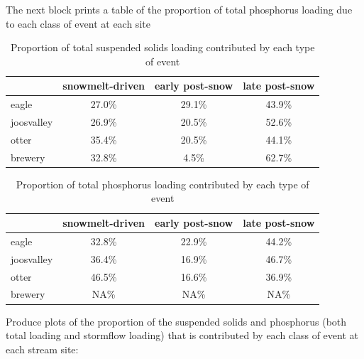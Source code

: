 \documentclass[12pt]{article}
\begin{document}
The next block prints a table of the proportion of total phosphorus loading due to each class of event at each site\\


\begin{table}[h]
\begin{center}
\begin{tabular}{lccc}
  & snowmelt-driven & early post-snow & late post-snow \\ 
  \hline
eagle & 27.0\% & 29.1\% & 43.9\% \\ 
  joosvalley & 26.9\% & 20.5\% & 52.6\% \\ 
  otter & 35.4\% & 20.5\% & 44.1\% \\ 
  brewery & 32.8\% & 4.5\% & 62.7\% \\ 
  \end{tabular}
\caption{Proportion of total suspended solids loading contributed by each type of event}
\label{tab:stot}
\end{center}
\end{table}
\begin{table}[h]
\begin{center}
\begin{tabular}{lccc}
  & snowmelt-driven & early post-snow & late post-snow \\ 
  \hline
eagle & 32.8\% & 22.9\% & 44.2\% \\ 
  joosvalley & 36.4\% & 16.9\% & 46.7\% \\ 
  otter & 46.5\% & 16.6\% & 36.9\% \\ 
  brewery & NA\% & NA\% & NA\% \\ 
  \end{tabular}
\caption{Proportion of total phosphorus loading contributed by each type of event}
\label{tab:ptot}
\end{center}
\end{table}










Produce plots of the proportion of the suspended solids and phosphorus (both total loading and stormflow loading) that is contributed by each class of event at each stream site:\\
\end{document}
